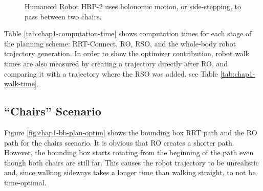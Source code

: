 \begin{figure}
  \caption{Humanoid Robot HRP-2 uses holonomic motion, or
    side-stepping, to pass between two chairs.}
  \label{fig:chap1-hrp2-chairs}
\end{figure}

Table \ref{tab:chap1-computation-time} shows computation times for
each stage of the planning scheme: RRT-Connect, RO, RSO, and the
whole-body robot trajectory generation. In order to show the optimizer
contribution, robot walk times are also measured by creating a
trajectory directly after RO, and comparing it with a trajectory where
the RSO was added, see Table \ref{tab:chap1-walk-time}.

\subsection{``Chairs'' Scenario}
\label{subsec:chap1-chairs}

Figure \ref{fig:chap1-bb-plan-optim} shows the bounding box RRT path
and the RO path for the chairs scenario. It is obvious that RO creates
a shorter path. However, the bounding box starts rotating from the
beginning of the path even though both chairs are still far. This
causes the robot trajectory to be unrealistic and, since walking
sideways takes a longer time than walking straight, to not be
time-optimal.

